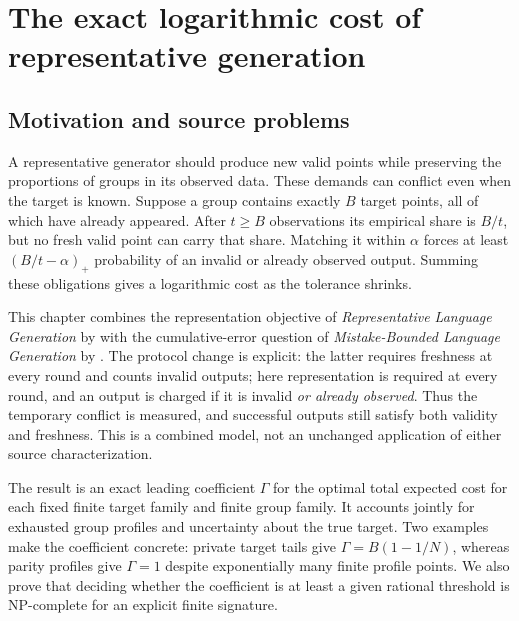 \section{The exact logarithmic cost of representative generation}
\label{gm:chapter}
\newcommand{\gmip}[2]{\langle #1,#2\rangle}
\newcommand{\gmpos}[1]{\left(#1\right)_+}

\subsection{Motivation and source problems}
A representative generator should produce new valid points while preserving the proportions of groups in its observed data. These demands can conflict even when the target is known. Suppose a group contains exactly $B$ target points, all of which have already appeared. After $t\ge B$ observations its empirical share is $B/t$, but no fresh valid point can carry that share. Matching it within $\alpha$ forces at least $(B/t-\alpha)_+$ probability of an invalid or already observed output. Summing these obligations gives a logarithmic cost as the tolerance shrinks.

This chapter combines the representation objective of \emph{Representative Language Generation} by \citet{P09} with the cumulative-error question of \emph{Mistake-Bounded Language Generation} by \citet{P29}. The protocol change is explicit: the latter requires freshness at every round and counts invalid outputs; here representation is required at every round, and an output is charged if it is invalid \emph{or already observed}. Thus the temporary conflict is measured, and successful outputs still satisfy both validity and freshness. This is a combined model, not an unchanged application of either source characterization.

The result is an exact leading coefficient $\Gamma$ for the optimal total expected cost for each fixed finite target family and finite group family. It accounts jointly for exhausted group profiles and uncertainty about the true target. Two examples make the coefficient concrete: private target tails give $\Gamma=B(1-1/N)$, whereas parity profiles give $\Gamma=1$ despite exponentially many finite profile points. We also prove that deciding whether the coefficient is at least a given rational threshold is NP-complete for an explicit finite signature.

